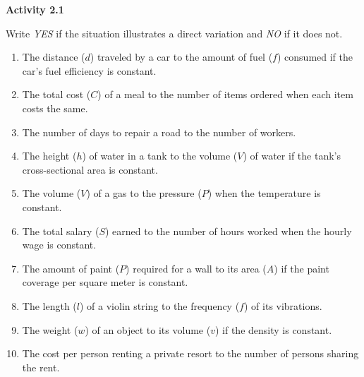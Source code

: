 \vspace{0.3ex}
\noindent\textbf{Activity 2.1}

\vspace{0.2ex}

Write \emph{YES} if the situation illustrates a direct variation and \emph{NO} if it does not.

\begin{enumerate}[noitemsep, label = \color{blue}\arabic*. ]
   \item The distance ($d$) traveled by a car to the amount of fuel ($f$) consumed if the car's fuel efficiency is constant.
   \item The total cost ($C$) of a meal to the number of items ordered when each item costs the same.
   \item The number of days to repair a road to the number of workers.
   \item The height ($h$) of water in a tank to the volume ($V$) of water if the tank's cross-sectional area is constant.
   \item The volume ($V$) of a gas to the pressure ($P$) when the temperature is  constant.
   \item The total salary ($S$) earned to the number of hours worked when the hourly wage is constant.
   \item The amount of paint ($P$) required for a wall to its area ($A$) if the paint coverage per square meter is constant.
   \item The length ($l$) of a violin string to the frequency ($f$) of its
   vibrations.
   \item The weight ($w$) of an object to its volume ($v$) if the density is constant.
   \item The cost per person renting a private resort to the number of
   persons sharing the rent.
\end{enumerate}

